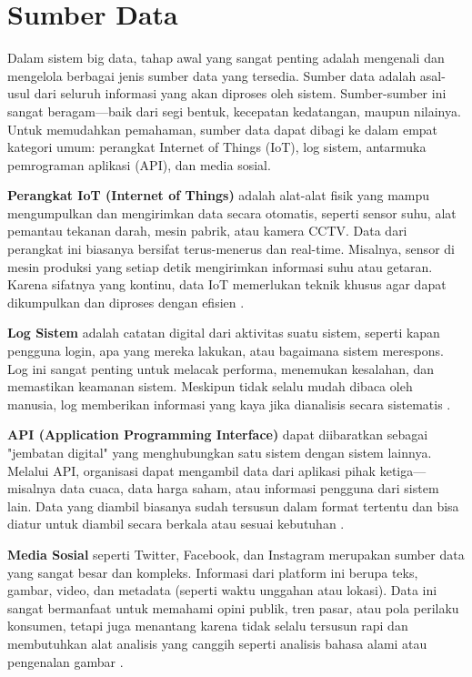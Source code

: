 \section{Sumber Data}

Dalam sistem big data, tahap awal yang sangat penting adalah mengenali dan mengelola berbagai jenis sumber data yang tersedia. Sumber data adalah asal-usul dari seluruh informasi yang akan diproses oleh sistem. Sumber-sumber ini sangat beragam—baik dari segi bentuk, kecepatan kedatangan, maupun nilainya. Untuk memudahkan pemahaman, sumber data dapat dibagi ke dalam empat kategori umum: perangkat Internet of Things (IoT), log sistem, antarmuka pemrograman aplikasi (API), dan media sosial.

\textbf{Perangkat IoT (Internet of Things)} adalah alat-alat fisik yang mampu mengumpulkan dan mengirimkan data secara otomatis, seperti sensor suhu, alat pemantau tekanan darah, mesin pabrik, atau kamera CCTV. Data dari perangkat ini biasanya bersifat terus-menerus dan real-time. Misalnya, sensor di mesin produksi yang setiap detik mengirimkan informasi suhu atau getaran. Karena sifatnya yang kontinu, data IoT memerlukan teknik khusus agar dapat dikumpulkan dan diproses dengan efisien \cite{gubbi2013internet}.

\textbf{Log Sistem} adalah catatan digital dari aktivitas suatu sistem, seperti kapan pengguna login, apa yang mereka lakukan, atau bagaimana sistem merespons. Log ini sangat penting untuk melacak performa, menemukan kesalahan, dan memastikan keamanan sistem. Meskipun tidak selalu mudah dibaca oleh manusia, log memberikan informasi yang kaya jika dianalisis secara sistematis \cite{xu2009detecting}.

\textbf{API (Application Programming Interface)} dapat diibaratkan sebagai "jembatan digital" yang menghubungkan satu sistem dengan sistem lainnya. Melalui API, organisasi dapat mengambil data dari aplikasi pihak ketiga—misalnya data cuaca, data harga saham, atau informasi pengguna dari sistem lain. Data yang diambil biasanya sudah tersusun dalam format tertentu dan bisa diatur untuk diambil secara berkala atau sesuai kebutuhan \cite{fielding2000architectural}.

\textbf{Media Sosial} seperti Twitter, Facebook, dan Instagram merupakan sumber data yang sangat besar dan kompleks. Informasi dari platform ini berupa teks, gambar, video, dan metadata (seperti waktu unggahan atau lokasi). Data ini sangat bermanfaat untuk memahami opini publik, tren pasar, atau pola perilaku konsumen, tetapi juga menantang karena tidak selalu tersusun rapi dan membutuhkan alat analisis yang canggih seperti analisis bahasa alami atau pengenalan gambar \cite{alam2017twitter}.

